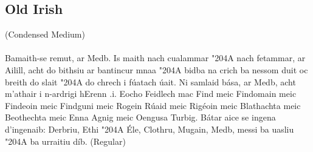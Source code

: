 \subsection*{Old Irish}
{ (Condensed Medium)\\[1ex]
\\[1ex]
\noindent{}Bamaith-se
remut, ar Medb. Is maith nach cualammar {\char"204A} nach fetammar, ar Ailill,
acht do bithsiu ar bantincur mnaa {\char"204A} bidba na crich ba nessom duit oc
breith do slait {\char"204A} do chrech i fúatach úait. Ni samlaid bása, ar Medb,
acht m'athair i n-ardrigi hErenn .i. Eocho Feidlech mac Find meic
Findomain meic Findeoin meic Findguni meic Rogein Rúaid meic Rigéoin
meic Blathachta meic Beothechta meic Enna Agnig meic Oengusa
Turbig. Bátar aice se ingena d'ingenaib: Derbriu, Ethi {\char"204A} Éle, Clothru,
Mugain, Medb, messi ba uasliu {\char"204A} ba urraitiu díb.} (Regular)\\[1ex]

